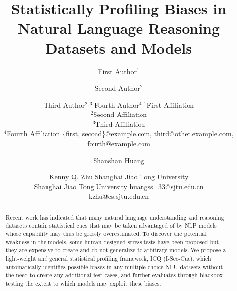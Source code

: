 \documentclass{article}
\title{Statistically Profiling Biases in Natural Language Reasoning Datasets and Models}
\author{
First Author$^1$
\and
Second Author$^2$\and
Third Author$^{2,3}$\And
Fourth Author$^4$
\affiliations
$^1$First Affiliation\\
$^2$Second Affiliation\\
$^3$Third Affiliation\\
$^4$Fourth Affiliation
\emails
\{first, second\}@example.com,
third@other.example.com,
fourth@example.com
}
\author{
Shanshan Huang
\and
Kenny Q. Zhu
\affiliations 
Shanghai Jiao Tong University \\
Shanghai Jiao Tong University
\emails
huangss\_33@sjtu.edu.cn \\
kzhu@cs.sjtu.edu.cn
}
\begin{document}
\maketitle
\begin{abstract}
Recent work has indicated that many natural language understanding and 
reasoning datasets contain statistical cues that
may be taken advantaged of by NLP models whose
capability may thus be grossly overestimated. 
To discover the potential weakness in the models, some human-designed 
stress tests have been proposed but they are expensive to create 
and do not generalize to arbitrary models. 
We propose a light-weight and general statistical profiling framework, 
ICQ (I-See-Cue), which automatically identifies possible biases
in any multiple-choice NLU datasets without 
the need to create any additional test cases, and further evaluates
through blackbox testing the extent to which models may exploit these biases. 
\end{abstract}










\end{document}
